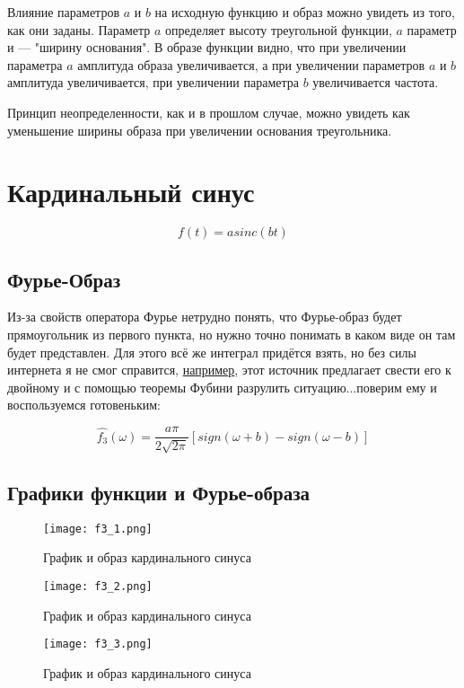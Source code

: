 Влияние параметров $a$ и $b$ на исходную функцию и образ можно увидеть из того, как они заданы. Параметр $a$ определяет высоту
треугольной функции, $a$ параметр $и$ — "ширину основания". В образе функции видно, что
при увеличении параметра $a$ амплитуда образа увеличивается, а при увеличении параметров
$a$ и $b$ амплитуда увеличивается, при увеличении параметра $b$ увеличивается частота.

Принцип неопределенности, как и в прошлом случае, можно увидеть как уменьшение
ширины образа при увеличении основания треугольника.

\section{Кардинальный синус}
$$
f(t) = asinc(bt)
$$


\subsection{Фурье-Образ}
Из-за свойств оператора Фурье нетрудно понять, что Фурье-образ будет прямоугольник из первого пункта, но нужно точно понимать в каком виде он там будет представлен.
Для этого всё же интеграл придётся взять, но без силы интернета я не смог справится, \href{https://math.stackexchange.com/questions/736749/fourier-transform-of-sinc-function}{например}, этот источник предлагает свести его к двойному и с помощью теоремы Фубини разрулить ситуацию...поверим ему и воспользуемся готовеньким:


$$\hat{f_3}(\omega) = \frac{a\pi}{2\sqrt{2\pi}}[ sign(\omega + b) - sign(\omega - b) ]$$

\subsection{Графики функции и Фурье-образа}

\begin{figure}[ht]
    \centering
    \texttt{[image: f3\_1.png]}
    \caption{График и образ кардинального синуса}
\end{figure}

\begin{figure}[ht]
    \centering
    \texttt{[image: f3\_2.png]}
    \caption{График и образ кардинального синуса}
\end{figure}

\begin{figure}[ht]
    \centering
    \texttt{[image: f3\_3.png]}
    \caption{График и образ кардинального синуса}
\end{figure}

